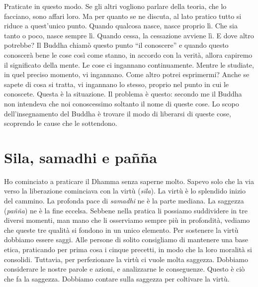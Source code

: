 Praticate in questo modo. Se gli altri vogliono parlare della teoria,
che lo facciano, sono affari loro. Ma per quanto se ne discuta, al lato
pratico tutto si riduce a quest'unico punto. Quando qualcosa nasce,
nasce proprio lì. Che sia tanto o poco, nasce sempre lì. Quando cessa,
la cessazione avviene lì. E dove altro potrebbe? Il Buddha chiamò questo
punto ``il conoscere'' e quando questo conoscerà bene le cose così come
stanno, in accordo con la verità, allora capiremo il significato della
mente. Le cose ci ingannano continuamente. Mentre le studiate, in quel
preciso momento, vi ingannano. Come altro potrei esprimermi? Anche se
sapete di cosa si tratta, vi ingannano lo stesso, proprio nel punto in
cui le conoscete. Questa è la situazione. Il problema è questo: secondo
me il Buddha non intendeva che noi conoscessimo soltanto il nome di
queste cose. Lo scopo dell'insegnamento del Buddha è trovare il modo di
liberarsi di queste cose, scoprendo le cause che le sottendono.

\section{Sila, samadhi e pañña}

Ho cominciato a praticare il Dhamma senza saperne molto. Sapevo solo che
la via verso la liberazione cominciava con la virtù (\emph{sīla}).%
La virtù è lo splendido inizio del cammino. La profonda pace di
\emph{samadhi}%
ne è la parte mediana. La saggezza
(\emph{pañña}) ne è la fine eccelsa. Sebbene nella pratica li possiamo
suddividere in tre diversi momenti, man mano che li osserviamo sempre
più in profondità, vediamo che queste tre qualità si fondono in un unico
elemento. Per sostenere la virtù dobbiamo essere saggi. Alle persone di
solito consigliamo di mantenere una base etica, praticando per prima
cosa i cinque precetti, in modo che la loro moralità si consolidi.
Tuttavia, per perfezionare la virtù ci vuole molta saggezza. Dobbiamo
considerare le nostre parole e azioni, e analizzarne le conseguenze.
Questo è ciò che fa la saggezza. Dobbiamo contare sulla saggezza per
coltivare la virtù.

